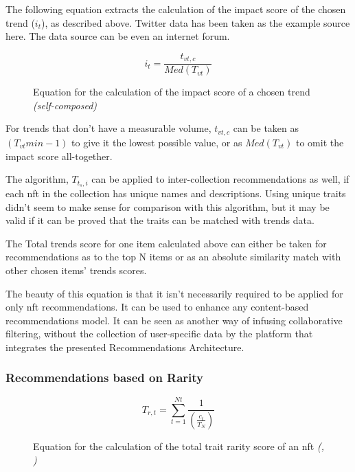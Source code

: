 \noindent The following equation extracts the calculation of the impact score of the chosen trend ($i_{t}$), as described above. Twitter data has been taken as the example source here. The data source can be even an internet forum.
\begin{figure}[h!]
\begin{equation}
i_{t} = \frac{t_{vt,c}}{Med(T_{vt})}
\end{equation}
\caption*{Equation for the calculation of the impact score of a chosen trend \textit{(self-composed)}}
\end{figure}

For trends that don't have a measurable volume, $t_{vt,c}$ can be taken as $\left(T_{vt}{min} - 1\right)$ to give it the lowest possible value, or as $Med(T_{vt})$ to omit the impact score all-together.

\bigbreak
The algorithm, $T_{t_{s},i}$ can be applied to inter-collection recommendations as well, if each \gls{nft} in the collection has unique names and descriptions. Using unique traits didn't seem to make sense for comparison with this algorithm, but it may be valid if it can be proved that the traits can be matched with trends data.

The Total trends score for one item calculated above can either be taken for recommendations as to the top N items or as an absolute similarity match with other chosen items' trends scores.

\bigbreak
The beauty of this equation is that it isn't necessarily required to be applied for only \gls{nft} recommendations. It can be used to enhance any content-based recommendations model. It can be seen as another way of infusing collaborative filtering, without the collection of user-specific data by the platform that integrates the presented Recommendations Architecture.


\subsubsection{Recommendations based on Rarity}
% 

\begin{figure}[h!]
\begin{equation}
T_{r,t} = \sum^{Nt}_{t=1} \frac{1}{\left(\frac{c_{t}}{T_{N}}\right)}
\end{equation}
\caption*{Equation for the calculation of the total trait rarity score of an \gls{nft} \textit{(\autocite{raritytools_ranking_2021}, \autocite{raritytools_introducing_2021})}}
\end{figure}

